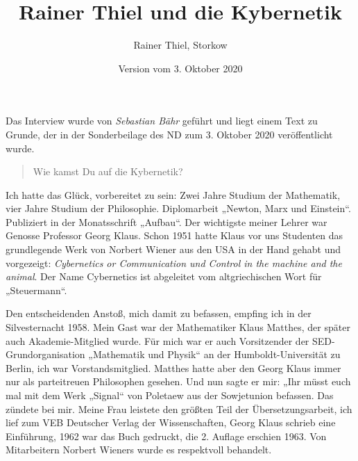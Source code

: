 \documentclass[11pt,a4paper]{article}
\title{Rainer Thiel und die Kybernetik}
\author{Rainer Thiel, Storkow}
\date{Version vom 3. Oktober 2020}
\newenvironment{frage}{\begin{quote}}{\end{quote}}
\begin{document}
\maketitle

Das Interview wurde von \emph{Sebastian Bähr} geführt und liegt einem Text zu
Grunde, der in der Sonderbeilage des ND zum 3. Oktober 2020 veröffentlicht
wurde.

\begin{frage}
  Wie kamst Du auf die Kybernetik?
\end{frage}
Ich hatte das Glück, vorbereitet zu sein: Zwei Jahre Studium der Mathematik,
vier Jahre Studium der Philosophie. Diplomarbeit „Newton, Marx und Einstein“.
Publiziert in der Monatsschrift „Aufbau“. Der wichtigste meiner Lehrer war
Genosse Professor Georg Klaus. Schon 1951 hatte Klaus vor uns Studenten das
grundlegende Werk von Norbert Wiener aus den USA in der Hand gehabt und
vorgezeigt: \emph{Cybernetics or Communication und Control in the machine and
  the animal}. Der Name Cybernetics ist abgeleitet vom altgriechischen Wort
für „Steuermann“.

Den entscheidenden Anstoß, mich damit zu befassen, empfing ich in der
Silvesternacht 1958. Mein Gast war der Mathematiker Klaus Matthes, der später
auch Akademie-Mitglied wurde. Für mich war er auch Vorsitzender der
SED-Grundorganisation „Mathematik und Physik“ an der Humboldt-Universität zu
Berlin, ich war Vorstandsmitglied. Matthes hatte aber den Georg Klaus immer
nur als parteitreuen Philosophen gesehen. Und nun sagte er mir: „Ihr müsst
euch mal mit dem Werk „Signal“ von Poletaew aus der Sowjetunion befassen. Das
zündete bei mir. Meine Frau leistete den größten Teil der Übersetzungsarbeit,
ich lief zum VEB Deutscher Verlag der Wissenschaften, Georg Klaus schrieb eine
Einführung, 1962 war das Buch gedruckt, die 2. Auflage erschien 1963. Von
Mitarbeitern Norbert Wieners wurde es respektvoll behandelt.
\end{document}
